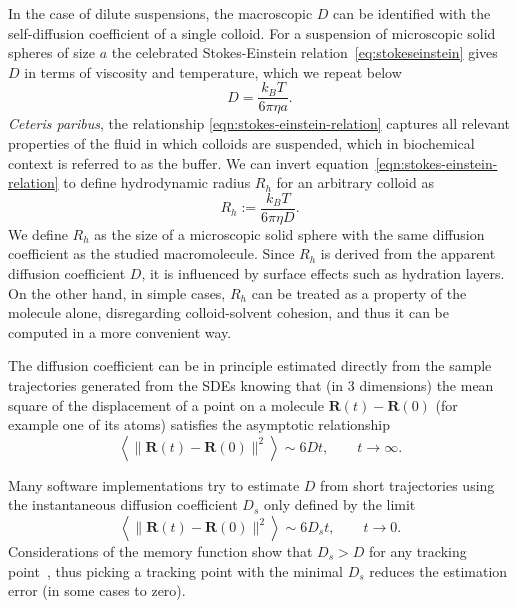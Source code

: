 \documentclass[physics]{doctoral}
\begin{document}
In the case of dilute suspensions, the macroscopic $D$ can be identified with the self-diffusion coefficient of a single colloid.
For a suspension of microscopic solid spheres of size $a$ the celebrated Stokes-Einstein relation~\eqref{eq:stokeseinstein} gives $D$ in terms of viscosity and temperature, which we repeat below
\begin{equation}
    D = \frac{k_B T}{6 \pi \eta a}.
    \label{eqn:stokes-einstein-relation}
\end{equation}
\textit{Ceteris paribus}, the relationship \eqref{eqn:stokes-einstein-relation} captures all relevant properties of the fluid in which colloids are suspended, which in biochemical context is referred to as the buffer.
We can invert equation~\eqref{eqn:stokes-einstein-relation} to define hydrodynamic radius $R_h$ for an arbitrary colloid as
\begin{equation}
    R_h :=  \frac{k_B T}{6 \pi \eta D}.
    \label{eqn:hydrodynamic-radius-definition}
\end{equation}
We define $R_h$ as the size of a microscopic solid sphere with the same diffusion coefficient as the studied macromolecule.
Since $R_h$ is derived from the apparent diffusion coefficient $D$, it is influenced by surface effects such as hydration layers.
On the other hand, in simple cases, $R_h$ can be treated as a property of the molecule alone, disregarding colloid-solvent cohesion, and thus it can be computed in a more convenient way.

The diffusion coefficient can be in principle estimated directly from the sample trajectories generated from the SDEs knowing that (in 3 dimensions) the mean square of the displacement of a point on a molecule $\bm{R}(t) - \bm{R}(0)$ (for example one of its atoms) satisfies the asymptotic relationship
\begin{equation}
    \left< \lVert \bm{R}(t) - \bm{R}(0)\rVert^2 \right> \sim 6 D t, \quad \quad t \to \infty.
\end{equation}

Many software implementations try to estimate $D$ from short trajectories using the instantaneous diffusion coefficient $D_{s}$ only defined by the limit
\begin{equation}
    \left< \lVert \bm{R}(t) - \bm{R}(0)\rVert^2 \right> \sim 6 D_{s} t, \quad \quad t \to 0.
\end{equation}
Considerations of the memory function show that $D_{s} > D$ for any tracking point~\cite{Cichocki_2019}, thus picking a tracking point with the minimal $D_{s}$ reduces the estimation error (in some cases to zero).
\end{document}

